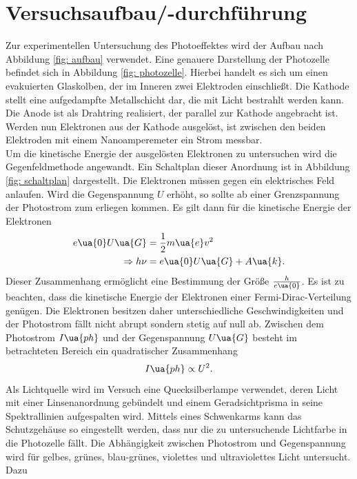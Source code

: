 \section{Versuchsaufbau/-durchführung}
Zur experimentellen Untersuchung des Photoeffektes wird der Aufbau nach Abbildung \ref{fig: aufbau} verwendet. Eine
genauere Darstellung der Photozelle befindet sich in Abbildung \ref{fig: photozelle}. Hierbei handelt es sich um einen
evakuierten Glaskolben, der im Inneren zwei Elektroden einschließt. Die Kathode stellt eine aufgedampfte
Metallschicht dar, die mit Licht bestrahlt werden kann. Die Anode ist als Drahtring realisiert, der parallel
zur Kathode angebracht ist. Werden nun Elektronen aus der Kathode ausgelöst, ist zwischen den beiden Elektroden
mit einem Nanoamperemeter ein Strom messbar. \\ %
Um die kinetische Energie der ausgelösten Elektronen zu untersuchen wird die Gegenfeldmethode angewandt. Ein Schaltplan
dieser Anordnung ist in Abbildung \ref{fig: schaltplan} dargestellt. Die Elektronen müssen gegen ein elektrisches Feld anlaufen.
Wird die Gegenspannung $U$ erhöht, so sollte ab einer Grenzspannung der Photostrom zum erliegen kommen. Es gilt dann
für die kinetische Energie der Elektronen
\begin{align}
  \label{eq:regress}
\begin{aligned}
  e\ua{0} U\ua{G} &= \frac{1}{2}m\ua{e}v^2 \\
  \Rightarrow h\nu &= e\ua{0}U\ua{G} + A\ua{k}.
\end{aligned}
\end{align}
Dieser Zusammenhang ermöglicht eine Bestimmung der Größe $\frac{h}{e\ua{0}}$. Es ist zu beachten, dass
die kinetische Energie der Elektronen einer Fermi-Dirac-Verteilung genügen. Die Elektronen
besitzen daher unterschiedliche Geschwindigkeiten und der Photostrom fällt nicht abrupt sondern
stetig auf null ab. Zwischen dem Photostrom $I\ua{ph}$ und der Gegenspannung $U\ua{G}$ besteht im betrachteten Bereich ein quadratischer Zusammenhang
\begin{equation}
  I\ua{ph} \propto U^2.
\end{equation}
Als Lichtquelle wird im Versuch eine Quecksilberlampe verwendet, deren Licht mit einer Linsenanordnung gebündelt
und einem Geradsichtprisma in seine Spektrallinien aufgespalten wird. Mittels eines Schwenkarms kann das Schutzgehäuse
so eingestellt werden, dass nur die zu untersuchende Lichtfarbe in die Photozelle fällt. Die Abhängigkeit zwischen
Photostrom und Gegenspannung wird für gelbes, grünes, blau-grünes, violettes und ultraviolettes Licht untersucht. Dazu
